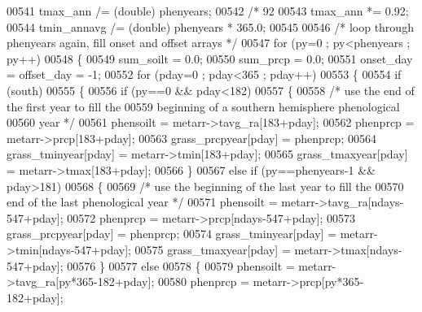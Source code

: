 \begin{DoxyCode}
{{00541             tmax\_ann /= (double) phenyears;
00542             \textcolor{comment}{/* 92%
00543             tmax\_ann *= 0.92;
00544             tmin\_annavg /= (double) phenyears * 365.0;
00545             
00546             \textcolor{comment}{/* loop through phenyears again, fill onset and offset arrays */}
00547             \textcolor{keywordflow}{for} (py=0 ; py<phenyears ; py++)
00548             \{
00549                 sum\_soilt = 0.0;
00550                 sum\_prcp = 0.0;
00551                 onset\_day = offset\_day = -1;
00552                 \textcolor{keywordflow}{for} (pday=0 ; pday<365 ; pday++)
00553                 \{
00554                     \textcolor{keywordflow}{if} (south)
00555                     \{
00556                         \textcolor{keywordflow}{if} (py==0 && pday<182)
00557                         \{
00558                             \textcolor{comment}{/* use the end of the first year to fill the }
00559 \textcolor{comment}{                            beginning of a southern hemisphere phenological}
00560 \textcolor{comment}{                            year */}
00561                             phensoilt = metarr->tavg\_ra[183+pday];
00562                             phenprcp = metarr->prcp[183+pday];
00563                             grass\_prcpyear[pday] = phenprcp;
00564                             grass\_tminyear[pday] = metarr->tmin[183+pday];
00565                             grass\_tmaxyear[pday] = metarr->tmax[183+pday];
00566                         \}
00567                         \textcolor{keywordflow}{else} \textcolor{keywordflow}{if} (py==phenyears-1 && pday>181)
00568                         \{
00569                             \textcolor{comment}{/* use the beginning of the last year to fill the}
00570 \textcolor{comment}{                            end of the last phenological year */}
00571                             phensoilt = metarr->tavg\_ra[ndays-547+pday];
00572                             phenprcp = metarr->prcp[ndays-547+pday];
00573                             grass\_prcpyear[pday] = phenprcp;
00574                             grass\_tminyear[pday] = metarr->tmin[ndays-547+pday];
00575                             grass\_tmaxyear[pday] = metarr->tmax[ndays-547+pday];
00576                         \}
00577                         \textcolor{keywordflow}{else}
00578                         \{
00579                             phensoilt = metarr->tavg\_ra[py*365-182+pday];
00580                             phenprcp = metarr->prcp[py*365-182+pday];
}}}
\end{DoxyCode}
